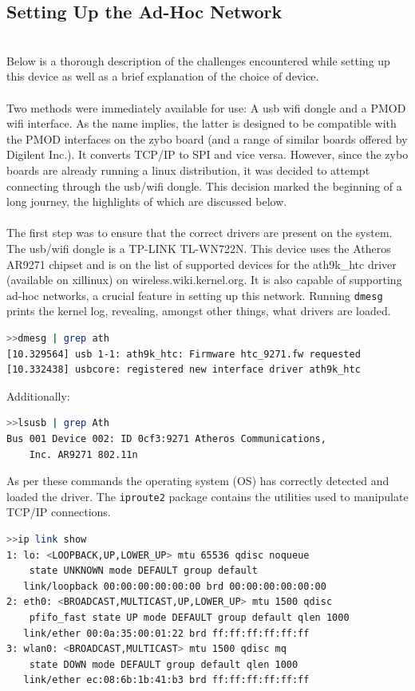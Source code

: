 \subsection{Setting Up the Ad-Hoc Network}~\\
Below is a thorough description of the challenges encountered while setting up this device as well as a brief explanation of the choice of device.
\\~\\
Two methods were immediately available for use: A usb wifi dongle and a PMOD wifi interface.
As the name implies, the latter is designed to be compatible with the PMOD interfaces on the zybo board (and a range of similar boards offered by Digilent Inc.).
It converts TCP/IP to SPI and vice versa.
However, since the zybo boards are already running a linux distribution, it was decided to attempt connecting through the usb/wifi dongle.
This decision marked the beginning of a long journey, the highlights of which are discussed below.
\\~\\
The first step was to ensure that the correct drivers are present on the system.
The usb/wifi dongle is a TP-LINK TL-WN722N.
This device uses the Atheros AR9271 chipset and is on the list of supported devices for the ath9k\_htc driver (available on xillinux) on wireless.wiki.kernel.org.
It is also capable of supporting ad-hoc networks, a crucial feature in setting up this network.
Running \texttt{dmesg} prints the kernel log, revealing, amongst other things, what drivers are loaded.
\begin{lstlisting}[language=bash]
>>dmesg | grep ath
[10.329564] usb 1-1: ath9k_htc: Firmware htc_9271.fw requested
[10.332438] usbcore: registered new interface driver ath9k_htc
\end{lstlisting}
Additionally:
\begin{lstlisting}[language=bash]
>>lsusb | grep Ath
Bus 001 Device 002: ID 0cf3:9271 Atheros Communications, 
	Inc. AR9271 802.11n
\end{lstlisting}

As per these commands the operating system (OS) has correctly detected and loaded the driver.
The \texttt{iproute2} package contains the utilities used to manipulate TCP/IP connections.
\begin{lstlisting}[language=bash]
>>ip link show
1: lo: <LOOPBACK,UP,LOWER_UP> mtu 65536 qdisc noqueue 
	state UNKNOWN mode DEFAULT group default 
   link/loopback 00:00:00:00:00:00 brd 00:00:00:00:00:00
2: eth0: <BROADCAST,MULTICAST,UP,LOWER_UP> mtu 1500 qdisc 
	pfifo_fast state UP mode DEFAULT group default qlen 1000
   link/ether 00:0a:35:00:01:22 brd ff:ff:ff:ff:ff:ff
3: wlan0: <BROADCAST,MULTICAST> mtu 1500 qdisc mq 
	state DOWN mode DEFAULT group default qlen 1000
   link/ether ec:08:6b:1b:41:b3 brd ff:ff:ff:ff:ff:ff
\end{lstlisting}


